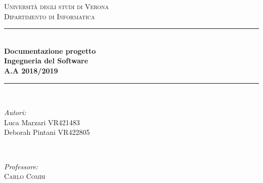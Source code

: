 \documentclass[a4paper,11pt]{report}
\begin{document}
\begin{titlepage}
\newcommand{\HRule}{\rule{\linewidth}{0.5mm}} %
\setlength{\topmargin}{0in}
\center


\textsc{\huge Università degli studi di Verona}\\[0.2cm] %
\textsc{\large Dipartimento di Informatica }\\[5cm] %


\HRule \\[1cm]
{ \huge \bfseries Documentazione progetto}\\[0.5cm]
{ \huge \bfseries Ingegneria del Software}\\[1cm]%
{  \bfseries A.A 2018/2019}\\[0.9cm]%

\HRule \\[5cm]


\begin{minipage}{0.4\textwidth}
	\begin{flushleft} \large
		\emph{Autori:}\\[0.2cm]
		{Luca Marzari \noindent VR421483}\\[0.2cm]
		{Deborah Pintani VR422805} \\ 
		
	\end{flushleft}
\end{minipage}
~
\begin{minipage}{0.5\textwidth}
	\begin{flushright} \large
		\emph{Professore:} \\[0.2cm]
		\textsc{Carlo Combi} \\%
	\end{flushright}
\end{minipage}\\[3cm]
\end{titlepage}
\end{document}

